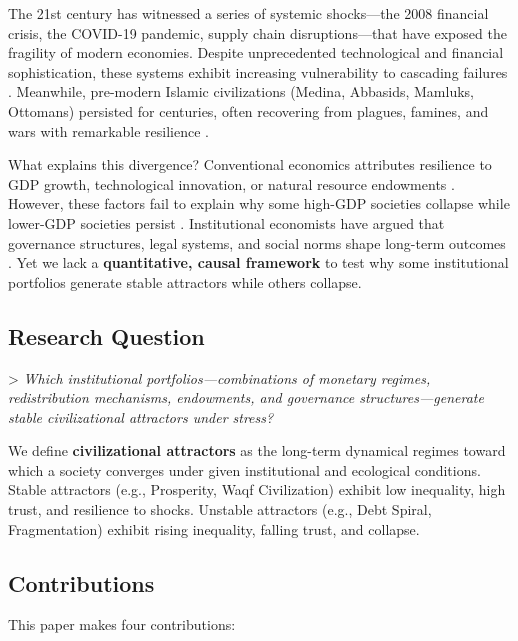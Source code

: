 \documentclass[12pt,a4paper]{article}
\begin{document}
The 21st century has witnessed a series of systemic shocks---the 2008 financial crisis, the COVID-19 pandemic, supply chain disruptions---that have exposed the fragility of modern economies. Despite unprecedented technological and financial sophistication, these systems exhibit increasing vulnerability to cascading failures \citep{haldane2011systemic, helbing2013globally, scheffer2012anticipating}. Meanwhile, pre-modern Islamic civilizations (Medina, Abbasids, Mamluks, Ottomans) persisted for centuries, often recovering from plagues, famines, and wars with remarkable resilience \citep{kennedy2001caliphate, lapidus1988muslim, watt1956muhammad}.

What explains this divergence? Conventional economics attributes resilience to GDP growth, technological innovation, or natural resource endowments \citep{lucas1988mechanics}. However, these factors fail to explain why some high-GDP societies collapse while lower-GDP societies persist \citep{tainter1988collapse}. Institutional economists have argued that governance structures, legal systems, and social norms shape long-term outcomes \citep{acemoglu2012why, north1990institutions, ostrom1990governing}. Yet we lack a \textbf{quantitative, causal framework} to test why some institutional portfolios generate stable attractors while others collapse.

\subsection{Research Question}

> \textit{Which institutional portfolios---combinations of monetary regimes, redistribution mechanisms, endowments, and governance structures---generate stable civilizational attractors under stress?}

We define \textbf{civilizational attractors} as the long-term dynamical regimes toward which a society converges under given institutional and ecological conditions. Stable attractors (e.g., Prosperity, Waqf Civilization) exhibit low inequality, high trust, and resilience to shocks. Unstable attractors (e.g., Debt Spiral, Fragmentation) exhibit rising inequality, falling trust, and collapse.

\subsection{Contributions}

This paper makes four contributions:
\end{document}
